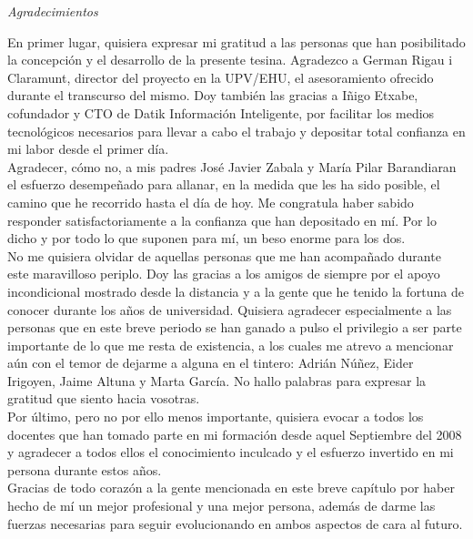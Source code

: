 \begin{flushright}
	\Large\textit{Agradecimientos}
\end{flushright}

En primer lugar, quisiera expresar mi gratitud a las personas que han posibilitado la concepción y el desarrollo de la presente tesina. Agradezco a German Rigau i Claramunt, director del proyecto en la UPV/EHU, el asesoramiento ofrecido durante el transcurso del mismo. Doy también las gracias a Iñigo Etxabe, cofundador y CTO de Datik Información Inteligente, por facilitar los medios tecnológicos necesarios para llevar a cabo el trabajo y depositar total confianza en mi labor desde el primer día.\\

Agradecer, cómo no, a mis padres José Javier Zabala y María Pilar Barandiaran el esfuerzo desempeñado para allanar, en la medida que les ha sido posible, el camino que he recorrido hasta el día de hoy. Me congratula haber sabido responder satisfactoriamente a la confianza que han depositado en mí. Por lo dicho y por todo lo que suponen para mí, un beso enorme para los dos.\\

No me quisiera olvidar de aquellas personas que me han acompañado durante este maravilloso periplo. Doy las gracias a los amigos de siempre por el apoyo incondicional mostrado desde la distancia y a la gente que he tenido la fortuna de conocer durante los años de universidad. Quisiera agradecer especialmente a las personas que en este breve periodo se han ganado a pulso el privilegio a ser parte importante de lo que me resta de existencia, a los cuales me atrevo a mencionar aún con el temor de dejarme a alguna en el tintero: Adrián Núñez, Eider Irigoyen, Jaime Altuna y Marta García. No hallo palabras para expresar la gratitud que siento hacia vosotras.\\

Por último, pero no por ello menos importante, quisiera evocar a todos los docentes que han tomado parte en mi formación desde aquel Septiembre del 2008 y agradecer a todos ellos el conocimiento inculcado y el esfuerzo invertido en mi persona durante estos años.\\

Gracias de todo corazón a la gente mencionada en este breve capítulo por haber hecho de mí un mejor profesional y una mejor persona, además de darme las fuerzas necesarias para seguir evolucionando en ambos aspectos de cara al futuro.\\

